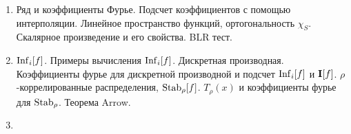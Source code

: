 \begin{enumerate}
    \item Ряд и коэффициенты Фурье. Подсчет коэффициентов с помощью интерполяции. Линейное пространство функций, ортогональность
        $\chi_S$. Скалярное произведение и его свойства. BLR тест.
    \item $\mathrm{Inf}_i[f]$. Примеры вычисления $\mathrm{Inf}_i[f]$. Дискретная производная. Коэффициенты фурье для дискретной производной и 
        подсчет $\mathrm{Inf}_i[f]$ и $\mathbf{I}[f]$. $\rho$-коррелированные распределения, $\mathrm{Stab}_{\rho}[f]$. $T_{\rho}(x)$ и коэффициенты фурье
        для $\mathrm{Stab}_{\rho}$. Теорема Arrow.
    \item 
\end{enumerate}